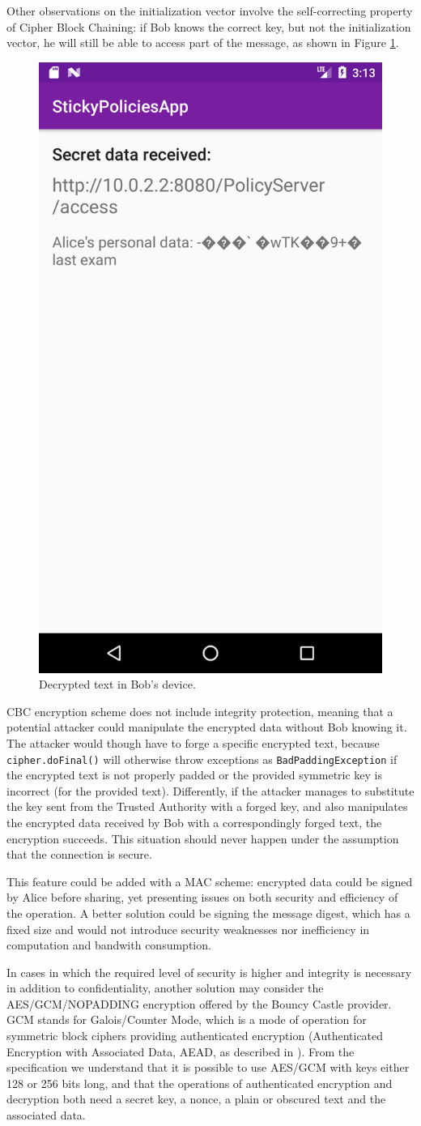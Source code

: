 Other observations on the initialization vector involve the self-correcting property of Cipher Block Chaining: if Bob knows the correct key, but not the initialization vector, he will still be able to access part of the message, as shown in Figure \ref{fig:DecryptCBCInvalidIV}.

\begin{figure}
	\centering
	\includegraphics[width=0.35\linewidth]{DecryptCBCInvalidIV.png}
	\caption{Decrypted text in Bob's device.}
	\label{fig:DecryptCBCInvalidIV}
\end{figure}

CBC encryption scheme does not include integrity protection, meaning that a potential attacker could manipulate the encrypted data without Bob knowing it. The attacker would though have to forge a specific encrypted text, because \texttt{cipher.doFinal()} will otherwise throw exceptions as \texttt{BadPaddingException} if the encrypted text is not properly padded or the provided symmetric key is incorrect (for the provided text). Differently, if the attacker manages to substitute the key sent from the Trusted Authority with a forged key, and also manipulates the encrypted data received by Bob with a correspondingly forged text, the encryption succeeds. This situation should never happen under the assumption that the connection is secure.

This feature could be added with a MAC scheme: encrypted data could be signed by Alice before sharing, yet presenting issues on both security and efficiency of the operation. A better solution could be signing the message digest, which has a fixed size and would not introduce security weaknesses nor inefficiency in computation and bandwith consumption.

In cases in which the required level of security is higher and integrity is necessary in addition to confidentiality, another solution may consider the AES/GCM/NOPADDING encryption offered by the Bouncy Castle provider. GCM stands for Galois/Counter Mode, which is a mode of operation for symmetric block ciphers providing authenticated encryption (Authenticated Encryption with Associated Data, AEAD, as described in \cite{rfc5116}). From the specification we understand that it is possible to use AES/GCM with keys either 128 or 256 bits long, and that the operations of authenticated encryption and decryption both need a secret key, a nonce, a plain or obscured text and the associated data.

